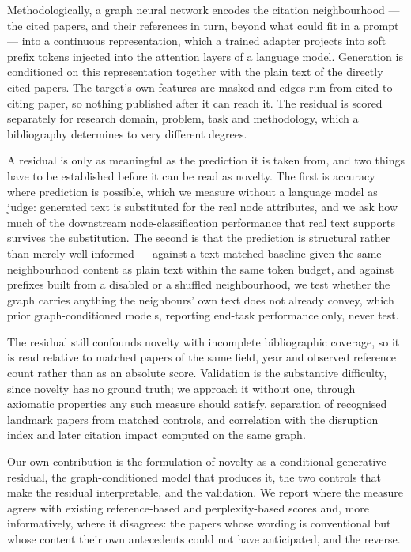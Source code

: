 \documentclass[12pt]{article}
\begin{document}
Methodologically, a graph neural network encodes the citation
neighbourhood — the cited papers, and their references in turn,
beyond what could fit in a prompt — into a continuous representation,
which a trained adapter projects into soft prefix tokens injected
into the attention layers of a language model. Generation is
conditioned on this representation together with the plain text of
the directly cited papers. The target's own features are masked and
edges run from cited to citing paper, so nothing published after it
can reach it. The residual is scored separately for research domain,
problem, task and methodology, which a bibliography determines to
very different degrees.

A residual is only as meaningful as the prediction it is taken from,
and two things have to be established before it can be read as
novelty. The first is accuracy where prediction is possible, which we
measure without a language model as judge: generated text is
substituted for the real node attributes, and we ask how much of the
downstream node-classification performance that real text supports
survives the substitution. The second is that the prediction is
structural rather than merely well-informed — against a text-matched
baseline given the same neighbourhood content as plain text within
the same token budget, and against prefixes built from a disabled or
a shuffled neighbourhood, we test whether the graph carries anything
the neighbours' own text does not already convey, which prior
graph-conditioned models, reporting end-task performance only, never
test.

The residual still confounds novelty with incomplete bibliographic
coverage, so it is read relative to matched papers of the same field,
year and observed reference count rather than as an absolute score.
Validation is the substantive difficulty, since novelty has no ground
truth; we approach it without one, through axiomatic properties any
such measure should satisfy, separation of recognised landmark papers
from matched controls, and correlation with the disruption index and
later citation impact computed on the same graph.

Our own contribution is the formulation of novelty as a conditional
generative residual, the graph-conditioned model that produces it,
the two controls that make the residual interpretable, and the
validation. We report where the measure agrees with existing
reference-based and perplexity-based scores and, more informatively,
where it disagrees: the papers whose wording is conventional but
whose content their own antecedents could not have anticipated, and
the reverse.
\end{document}
